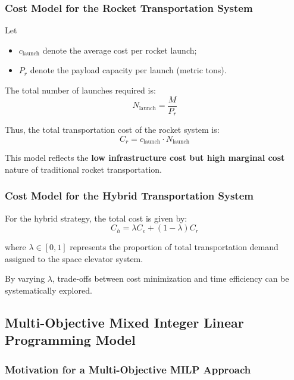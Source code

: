 \documentclass{mcmthesis}
\begin{document}
\subsubsection{Cost Model for the Rocket Transportation System}

Let
\begin{itemize}
    \item $c_{\text{launch}}$ denote the average cost per rocket launch;
    \item $P_r$ denote the payload capacity per launch (metric tons).
\end{itemize}

The total number of launches required is:
\begin{equation}
    N_{\text{launch}} = \frac{M}{P_r}
\end{equation}

Thus, the total transportation cost of the rocket system is:
\begin{equation}
    C_r = c_{\text{launch}} \cdot N_{\text{launch}}
\end{equation}

This model reflects the \textbf{low infrastructure cost but high marginal cost} nature of traditional rocket transportation.

\subsubsection{Cost Model for the Hybrid Transportation System}

For the hybrid strategy, the total cost is given by:
\begin{equation}
    C_h = \lambda C_e + (1 - \lambda) C_r
\end{equation}

where $\lambda \in [0,1]$ represents the proportion of total transportation demand assigned to the space elevator system.

By varying $\lambda$, trade-offs between cost minimization and time efficiency can be systematically explored.

\subsection{Multi-Objective Mixed Integer Linear Programming Model}

\subsubsection{Motivation for a Multi-Objective MILP Approach}
\end{document}
